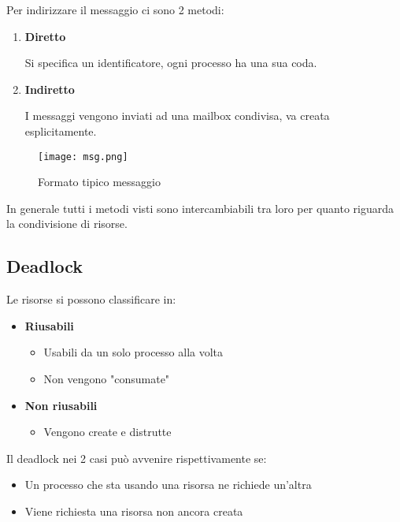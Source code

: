\documentclass{article}
\begin{document}
\noindent Per indirizzare il messaggio ci sono 2 metodi:
\begin{enumerate}
    \item \textbf{Diretto}

        Si specifica un identificatore, ogni processo ha una sua coda.

    \item \textbf{Indiretto}

        I messaggi vengono inviati ad una mailbox condivisa, va creata esplicitamente.\newline
    
\end{enumerate}

\begin{figure}[ht]
    \centering
    \texttt{[image: msg.png]}
    \caption{Formato tipico messaggio}
    \label{fig:msg}
\end{figure}

\noindent In generale tutti i metodi visti sono intercambiabili tra loro per quanto riguarda la condivisione di risorse. 

\subsection{Deadlock}

Le risorse si possono classificare in:
\begin{itemize}
    \item \textbf{Riusabili}
        \begin{itemize}
            \item Usabili da un solo processo alla volta
            \item Non vengono "consumate"
        \end{itemize}

    \item \textbf{Non riusabili}
        \begin{itemize}
            \item Vengono create e distrutte
        \end{itemize}
\end{itemize}

\vspace{3pt}

\noindent Il deadlock nei 2 casi può avvenire rispettivamente se:
\begin{itemize}
    \item Un processo che sta usando una risorsa ne richiede un'altra
    \item Viene richiesta una risorsa non ancora creata\newline
\end{itemize}
\end{document}
